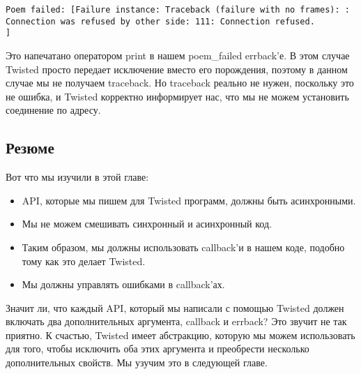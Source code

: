  \begin{verbatim}
Poem failed: [Failure instance: Traceback (failure with no frames): : Connection was refused by other side: 111: Connection refused.
]
\end{verbatim} 


Это напечатано оператором print в нашем poem\_failed 
errback'е. В этом случае Twisted просто передает 
исключение вместо его порождения, поэтому в данном 
случае мы не получаем traceback. Но traceback реально не 
нужен, поскольку это не ошибка, и Twisted корректно информирует 
нас, что мы не можем установить соединение по адресу.


\subsection{Резюме}

Вот что мы изучили в этой главе:

\begin{itemize}
\item API, которые мы пишем для Twisted программ, должны быть асинхронными.
\item Мы не можем смешивать синхронный и асинхронный код.
\item Таким образом, мы должны использовать callback'и в нашем коде, подобно 
тому как это делает Twisted.
\item Мы должны управлять ошибками в callback'ах.
\end{itemize}


Значит ли, что каждый API, который мы написали с помощью 
Twisted должен включать два дополнительных аргумента, 
callback и errback? Это звучит не так приятно. 
К счастью, Twisted имеет абстракцию, которую мы можем 
использовать для того, чтобы исключить оба этих аргумента 
и преобрести несколько дополнительных свойств. 
Мы узучим это в следующей главе.

